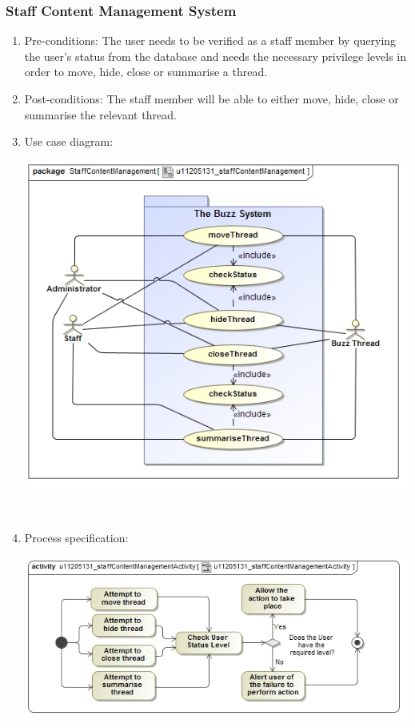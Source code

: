 \documentclass[hidelinks, 12pt, oneside]{article}
\begin{document}
\subsubsection{Staff Content Management System}
\begin{enumerate}
	\item Pre-conditions: The user needs to be verified as a staff member by querying the user's status from the database and needs the necessary privilege levels in order to move, hide, close or summarise a thread.
	
	\item Post-conditions: The staff member will be able to either move, hide, close or summarise the relevant thread.

	\item Use case diagram:\\
	\centerline{\includegraphics[scale=0.7]{u11205131_staffContentManagement}}\\
	\item Process specification:\\ 
	\centerline{\includegraphics[scale=0.7]{u11205131_staffContentManagementActivity}}
\end{enumerate}
\end{document}
